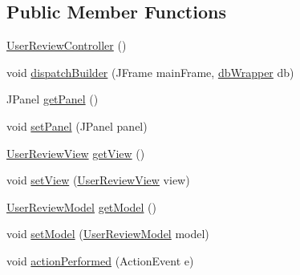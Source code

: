 \subsection*{Public Member Functions}
\begin{DoxyCompactItemize}
\item 
\mbox{\hyperlink{classcom_1_1_b_n_u_1_1pages_1_1_user_review_1_1_user_review_controller_a432927e64ed83381ae8df586b12872c9}{User\+Review\+Controller}} ()
\item 
void \mbox{\hyperlink{classcom_1_1_b_n_u_1_1pages_1_1_user_review_1_1_user_review_controller_a33b45dd3b33df3ebac5b43b91106efaa}{dispatch\+Builder}} (J\+Frame main\+Frame, \mbox{\hyperlink{interfacecom_1_1_b_n_u_1_1database_1_1db_wrapper}{db\+Wrapper}} db)
\item 
J\+Panel \mbox{\hyperlink{classcom_1_1_b_n_u_1_1pages_1_1_user_review_1_1_user_review_controller_a929fd221d25725d016671d9d9900a33d}{get\+Panel}} ()
\item 
void \mbox{\hyperlink{classcom_1_1_b_n_u_1_1pages_1_1_user_review_1_1_user_review_controller_aa1164d2e4e9781e3dfc9c2e4edd9b706}{set\+Panel}} (J\+Panel panel)
\item 
\mbox{\hyperlink{classcom_1_1_b_n_u_1_1pages_1_1_user_review_1_1_user_review_view}{User\+Review\+View}} \mbox{\hyperlink{classcom_1_1_b_n_u_1_1pages_1_1_user_review_1_1_user_review_controller_a8f634623a42861aa491e2fe82c441d39}{get\+View}} ()
\item 
void \mbox{\hyperlink{classcom_1_1_b_n_u_1_1pages_1_1_user_review_1_1_user_review_controller_a07b3d4b31478288a189c1b1d35a137f0}{set\+View}} (\mbox{\hyperlink{classcom_1_1_b_n_u_1_1pages_1_1_user_review_1_1_user_review_view}{User\+Review\+View}} view)
\item 
\mbox{\hyperlink{classcom_1_1_b_n_u_1_1pages_1_1_user_review_1_1_user_review_model}{User\+Review\+Model}} \mbox{\hyperlink{classcom_1_1_b_n_u_1_1pages_1_1_user_review_1_1_user_review_controller_af623ba70e175662abbd3c1c6dc5af336}{get\+Model}} ()
\item 
void \mbox{\hyperlink{classcom_1_1_b_n_u_1_1pages_1_1_user_review_1_1_user_review_controller_aa4a8a1e375a50ac5b3220e8a088a1bd8}{set\+Model}} (\mbox{\hyperlink{classcom_1_1_b_n_u_1_1pages_1_1_user_review_1_1_user_review_model}{User\+Review\+Model}} model)
\item 
void \mbox{\hyperlink{classcom_1_1_b_n_u_1_1pages_1_1_user_review_1_1_user_review_controller_a42fdf88d32f4e8a03400f39aa3c2311f}{action\+Performed}} (Action\+Event e)
\end{DoxyCompactItemize}


